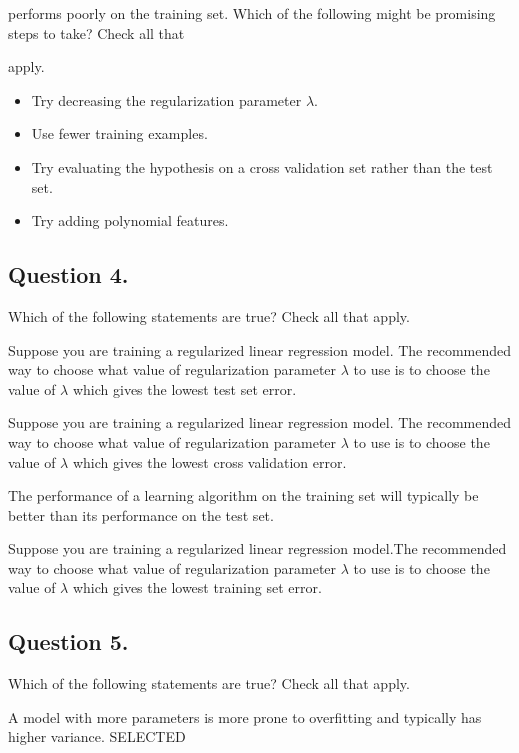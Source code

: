 performs poorly on the training set. Which of the following might be promising steps to take? Check all that

apply.

\begin{itemize}
\item Try decreasing the regularization parameter $\lambda$.

\item Use fewer training examples.

\item Try evaluating the hypothesis on a cross validation set rather than the test set.

\item Try adding polynomial features.
\end{itemize}
\subsection*{Question 4. }
Which of the following statements are true? Check all that apply.

Suppose you are training a regularized linear regression model. The recommended way to choose what value of regularization parameter $\lambda$ to use is to choose the value of $\lambda$ which gives the lowest test set error.

Suppose you are training a regularized linear regression model. The recommended way to choose what value of regularization parameter $\lambda$ to use is to choose the value of $\lambda$ which gives the lowest cross validation error.

The performance of a learning algorithm on the training set will typically be better than its performance on the test set.

Suppose you are training a regularized linear regression model.The recommended way to choose what value of regularization parameter $\lambda$ to use is to choose the value of $\lambda$ which gives the lowest training set error.

\subsection*{Question 5. }
Which of the following statements are true? Check all that apply.

A model with more parameters is more prone to overfitting and typically has higher variance. SELECTED

